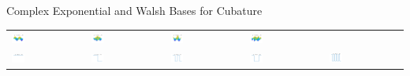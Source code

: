 \documentclass[11pt,compress,xcolor={usenames,dvipsnames},aspectratio=169]{beamer}
\begin{document}
\begin{frame}{Complex Exponential and Walsh Bases for Cubature}
\begin{tabular}{>{\centering}m{}>{\centering}m{}>{\centering}m{}>{\centering}m{}>{\centering}m{}}
\includegraphics[width =0.18\textwidth]{ProgramsImages/CosineSine_Degree_1_2.png}  &
\includegraphics[width =0.18\textwidth]{ProgramsImages/CosineSine_Degree_1_3.png}  &
\includegraphics[width =0.18\textwidth]{ProgramsImages/CosineSine_Degree_2_2.png}  &
\includegraphics[width =0.18\textwidth]{ProgramsImages/CosineSine_Degree_2_3.png} 
\tabularnewline[0ex]
		\includegraphics[width =0.18\textwidth]{ProgramsImages/Walsh_Degree_0.png}  &
\includegraphics[width =0.18\textwidth]{ProgramsImages/Walsh_Degree_1.png}  &
\includegraphics[width =0.18\textwidth]{ProgramsImages/Walsh_Degree_2.png}  &
\includegraphics[width =0.18\textwidth]{ProgramsImages/Walsh_Degree_3.png}  &
\includegraphics[width =0.18\textwidth]{ProgramsImages/Walsh_Degree_4.png} 

\end{tabular}
\end{frame}
\end{document}

